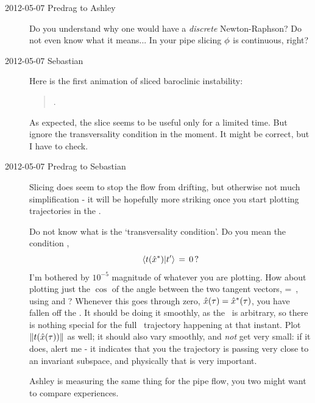 \begin{description}
\item[2012-05-07 Predrag to Ashley] Do you understand why one would have a
\emph{discrete} Newton-Raphson? Do not even know what it means... In your pipe
slicing ${\bf \phi}$ is continuous, right?


\item[2012-05-07 Sebastian] Here is the first animation of sliced baroclinic
instability:

\begin{quote}
.
\end{quote}

As expected, the slice seems to be useful only for a limited time. But
ignore the transversality condition in the moment. It might be correct,
but I have to check.

\item[2012-05-07 Predrag to Sebastian] Slicing does seem to stop the flow
from drifting, but otherwise not much simplification - it will be
hopefully more striking once you start plotting trajectories in the \statesp.

Do not know what is the `transversality condition'. Do you mean the
{\chartBord} condition ,
\[ %
\braket{\groupTan(\sspRSing)}{\sliceTan{}} \,=\, 0
\,?
\] %
I'm bothered by $10^{-5}$ magnitude of whatever you are plotting. How about
plotting just the $\cos$ of the angle between the two tangent vectors,
\beq
\cos \theta = \frac{\Re
            \braket{\groupTan(\sspRSing(\zeit))}{\sliceTan{}}
                    }{
            \Norm{\groupTan(\sspRSing(\zeit))}\,\,{\Norm{\sliceTan{}}}
                    }
\,,
\label{chartBordAng}
\eeq
using  and ? Whenever this goes through zero,
$\hat{x}(\tau)=\hat{x}^\ast(\tau)$, you have fallen off the {\chartBord}.
It should be doing it smoothly, as the \template\ is arbitrary, so there
is nothing special for the full \statesp\ trajectory happening at that
instant. Plot $\|{t(\hat{x}(\tau))}\|$ as well; it should also
vary smoothly, and \emph{not} get very small: if it does, alert me - it indicates
that you the trajectory is passing very close to an invariant subspace,
and physically that is very important.

Ashley is measuring the same thing for the pipe flow, you two might want
to compare experiences.


\end{description}
